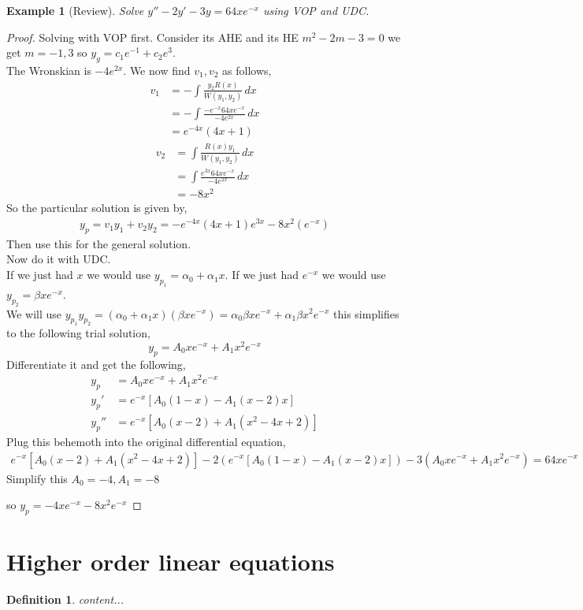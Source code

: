 \documentclass[oneside,11pt,pdftex,final]{book}%
\numberwithin{equation}{section}
\newtheorem{example}[theorem]{Example}
\newtheorem{definition}[theorem]{Definition}
\numberwithin{section}{chapter}
\numberwithin{equation}{chapter}
\begin{document}
\begin{example}[Review]
	Solve $ y''-2y'-3y=64xe^{-x} $ using
	VOP and UDC.
\end{example}
\begin{proof}
	Solving with VOP first. Consider its AHE and its HE $ m^2-2m-3=0 $ we get $ m=-1, 3$ so $ y_g=c_1e^{-1}+c_2e^{3}$.\\
	The Wronskian is $ -4e^{2x} $.
	We now find $ v_1, v_2 $ as follows,
	\begin{align*}
		v_1 &= -\int \frac{y_2R(x)}{W(y_1,y_2)}\, dx\\
		&=-\int \frac{-e^{-x} 64 xe^{-x}}{-4e^{2x}}\, dx\\
		&=e^{-4x}(4x+1)
	\end{align*}
\begin{align*}
	 v_2 &= \int \frac{R(x)y_1}{W(y_1,y_2)}\, dx\\
	 &= \int \frac{e^{3x} 64xe^{-x}}{-4e^{2x}}\, dx\\
	 &=-8x^2 
\end{align*}
So the particular solution is given by,
\begin{align*}
	y_p=v_1y_1+v_2y_2=-e^{-4x}(4x+1)e^{3x}-8x^2(e^{-x})
\end{align*}
Then use this for the general solution.
\\
Now do it with UDC.\\
If we just had $ x $ we would use $ y_{p_1}=\alpha_0+\alpha_1x $. If we just had $ e^{-x} $ we would use $ y_{p_2}=\beta xe^{-x} $.
\\
We will use $ y_{p_1}y_{p_2}=(\alpha_0+\alpha_1x)(\beta x e^{-x})=\alpha_0 \beta x e^{-x}+ \alpha_1 \beta x^2 e^{-x}$ this simplifies to the following trial solution,
\[ y_p=A_0xe^{-x}+A_1x^2e^{-x} \]
Differentiate it and get the following,
\begin{align*}
	y_p&=A_0xe^{-x}+A_1x^2e^{-x}\\
	y_p'&=e^{-x}[A_0(1-x)-A_1(x-2)x]\\
	y_p''&=e^{-x}[A_0(x-2)+A_1(x^2-4x+2)]
\end{align*}
Plug this behemoth into the original differential equation,
\begin{align*}
	e^{-x}[A_0(x-2)+A_1(x^2-4x+2)]-2(e^{-x}[A_0(1-x)-A_1(x-2)x])-3(A_0xe^{-x}+A_1x^2e^{-x})=64xe^{-x}
\end{align*}
Simplify this 
$ A_0=-4,A_1=-8 $

so $ y_p=-4xe^{-x}-8x^2e^{-x} $
\end{proof}

\section{Higher order linear equations}
\begin{definition}
	content...
\end{definition}
\end{document}
